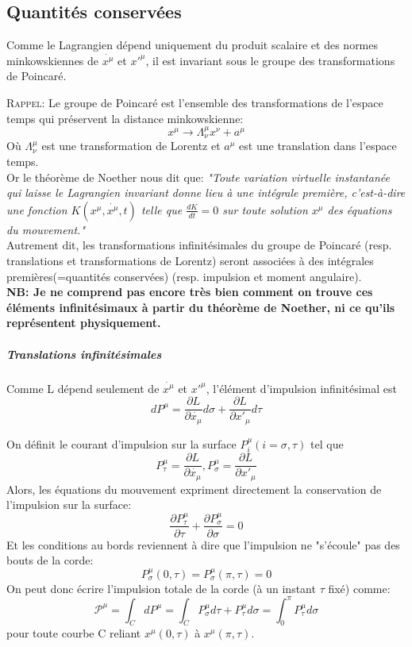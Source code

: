 \documentclass[a4paper,12pt]{article}
\begin{document}
\subsection{Quantités conservées}
Comme le Lagrangien dépend uniquement du produit scalaire et des normes minkowskiennes de $\dot{x^{\mu}}$ et $x'^{\mu}$, il est invariant sous le groupe des transformations de Poincaré.

\textsc{Rappel}: Le groupe de Poincaré est l'ensemble des transformations de l'espace temps qui préservent la distance minkowskienne:
$$ x^{\mu}\rightarrow\Lambda_{\nu}^{\mu}x^{\nu}+a^{\mu}$$ 
Où $\Lambda_{\nu}^{\mu}$ est une transformation de Lorentz et $a^{\mu}$ est une translation dans l'espace temps.\\
Or le théorème de Noether nous dit que:
\textit{"Toute variation virtuelle instantanée qui laisse le Lagrangien invariant donne lieu à une intégrale première, c'est-à-dire une fonction $K(x^{\mu},\dot{x^{\mu}},t)$ telle que $\frac{dK}{dt}=0$ sur toute solution $x^{\mu}$ des équations du mouvement."}\\
Autrement dit, les transformations infinitésimales du groupe de Poincaré (resp. translations  et transformations de Lorentz) seront associées à des intégrales premières(=quantités conservées) (resp. impulsion et moment angulaire).\\ 
\textbf{NB: Je ne comprend pas encore très bien comment on trouve ces éléments infinitésimaux à partir du théorème de Noether, ni ce qu'ils représentent physiquement.}
\subparagraph{Translations infinitésimales}
Comme L dépend seulement de $\dot{x^{\mu}}$ et $x'^{\mu}$, 
l'élément d'impulsion infinitésimal est 
$$dP^{\mu}=\frac{\partial L}{\partial \dot{x_{\mu}}}d\sigma+\frac{\partial L}{\partial x'_{\mu}}d\tau$$

On définit le courant d'impulsion sur la surface $P^{\mu}_{i}(i=\sigma,\tau)$ tel que 
$$P^{\mu}_{\tau}=\frac{\partial L}{\partial \dot{x_{\mu}}},			 P^{\mu}_{\sigma}=\frac{\partial L}{\partial x'_{\mu}}$$
Alors, les équations du mouvement expriment directement la conservation de l'impulsion sur la surface:
$$\frac{\partial P^{\mu}_{\tau}}{\partial \tau}+\frac{\partial P^{\mu}_{\sigma}}{\partial \sigma}=0$$
Et les conditions au bords reviennent à dire que l'impulsion ne "s'écoule" pas des bouts de la corde: $$P^{\mu}_{\sigma}(0,\tau)=P^{\mu}_{\sigma}(\pi,\tau)=0$$
On peut donc écrire l'impulsion totale de la corde (à un instant $\tau$ fixé) comme:
$$\mathcal{P^{\mu}}=\int_{C}dP^{\mu}=\int_{C}P^{\mu}_{\sigma}d\tau+P^{\mu}_{\tau}d\sigma=\int_{0}^{\pi}P^{\mu}_{\tau}d\sigma$$
pour toute courbe C reliant $x^{\mu}(0,\tau)$ à $x^{\mu}(\pi,\tau)$.
\end{document}
